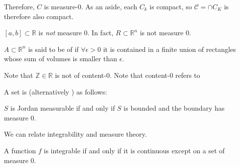 \documentclass{article}
\numberwithin{equation}{section}
\begin{document}
Therefore, $C$ is measure-$0$. As an aside, each $C_k$ is compact, so $\mathcal{C} = \cap C_K$ is therefore also compact.
\begin{theorem}
    $[a,b] \subset \mathbb{R}$ is \textit{not} measure $0$. In fact, $R \subset \mathbb{R}^n$ is not measure $0$.
\end{theorem}
\begin{definition}
    $A\subset \mathbb{R}^n$ is said to be of  if $\forall \epsilon > 0$ it is contained in a finite union of rectangles whose sum of volumes is smaller than $\epsilon$.
\end{definition}
Note that $\mathbb{Z} \in \mathbb{R}$ is not of content-$0$. Note that content-$0$ refers to 

A set is  (alternatively ) as follows:
\begin{definition}
    $S$ is Jordan measurable if and only if $S$ is bounded and the boundary has measure $0$. 
\end{definition}
We can relate integrability and measure theory.
\begin{theorem}
    A function $f$ is integrable if and only if it is continuous except on a set of measure $0$.
\end{theorem}
\end{document}
